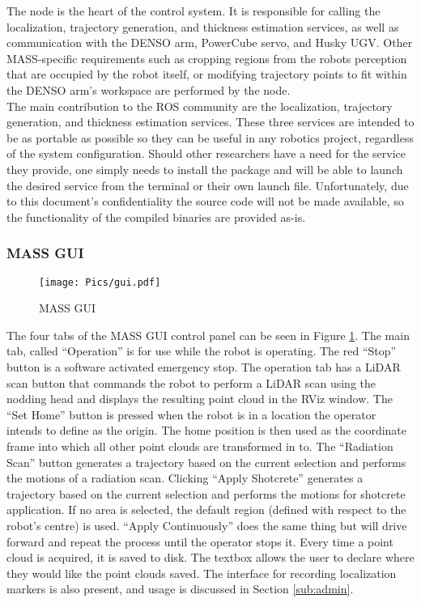 The  node is the heart of the control system. It is responsible for calling the localization, trajectory generation, and thickness estimation services, as well as communication with the DENSO arm, PowerCube servo, and Husky UGV. Other MASS-specific requirements such as cropping regions from the robots perception that are occupied by the robot itself, or  modifying trajectory points to fit within the DENSO arm's workspace are performed by the  node. \\

The main contribution to the ROS community are the localization, trajectory generation, and thickness estimation services. These three services are intended to be as portable as possible so they can be useful in any robotics project, regardless of the system configuration. Should other researchers have a need for the service they provide, one simply needs to install the package and will be able to launch the desired service from the terminal or their own launch file. Unfortunately, due to this document's confidentiality the source code will not be made available, so the functionality of the compiled binaries are provided as-is.\\

\subsubsection{MASS GUI}
\label{sub:gui}

\begin{figure}[ht!]
    \centering
    \texttt{[image: Pics/gui.pdf]}
    \caption{MASS GUI}
    \label{fig:thegui}
\end{figure}

The four tabs of the MASS GUI control panel can be seen in Figure \ref{fig:thegui}. The main tab, called ``Operation'' is for use while the robot is operating. The red ``Stop'' button is a software activated emergency stop. The operation tab has a LiDAR scan button that commands the robot to perform a LiDAR scan using the nodding head and displays the resulting point cloud in the RViz window. The ``Set Home'' button is pressed when the robot is in a location the operator intends to define as the origin. The home position is then used as the coordinate frame into which all other point clouds are transformed in to. The ``Radiation Scan'' button generates a trajectory based on the current selection and performs the motions of a radiation scan. Clicking ``Apply Shotcrete'' generates a trajectory based on the current selection and performs the motions for shotcrete application. If no area is selected, the default region (defined with respect to the robot's centre) is used. ``Apply Continuously'' does the same thing but will drive forward and repeat the process until the operator stops it. Every time a point cloud is acquired, it is saved to disk. The textbox allows the user to declare where they would like the point clouds saved. The interface for recording localization markers is also present, and usage is discussed in Section \ref{sub:admin}.\\

